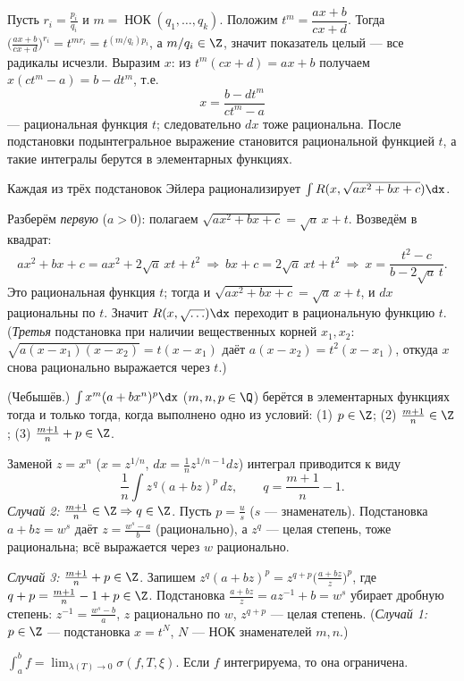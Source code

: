 \dok Пусть $r_i=\tfrac{p_i}{q_i}$ и $m=\operatorname{НОК}(q_1,\dots,q_k)$. Положим
$t^m=\dfrac{ax+b}{cx+d}$. Тогда
$\bigl(\tfrac{ax+b}{cx+d}\bigr)^{r_i}=t^{m r_i}=t^{(m/q_i)p_i}$, а $m/q_i\in\Z$, значит показатель
целый — все радикалы исчезли. Выразим $x$: из $t^m(cx+d)=ax+b$ получаем $x(ct^m-a)=b-dt^m$, т.е.
\[
  x=\frac{b-dt^m}{ct^m-a}
\]
— рациональная функция $t$; следовательно $dx$ тоже рациональна. После подстановки подынтегральное
выражение становится рациональной функцией $t$, а такие интегралы берутся в элементарных функциях.

\stmt Каждая из трёх подстановок Эйлера рационализирует $\int R(x,\sqrt{ax^2+bx+c})\dx$.

\dok Разберём \emph{первую} ($a>0$): полагаем $\sqrt{ax^2+bx+c}=\sqrt a\,x+t$. Возведём в квадрат:
\[
  ax^2+bx+c=ax^2+2\sqrt a\,xt+t^2\ \Rightarrow\ bx+c=2\sqrt a\,xt+t^2\ \Rightarrow\
  x=\frac{t^2-c}{b-2\sqrt a\,t}.
\]
Это рациональная функция $t$; тогда и $\sqrt{ax^2+bx+c}=\sqrt a\,x+t$, и $dx$ рациональны по $t$.
Значит $R(x,\sqrt{\dots})\dx$ переходит в рациональную функцию $t$. (\emph{Третья} подстановка при
наличии вещественных корней $x_1,x_2$: $\sqrt{a(x-x_1)(x-x_2)}=t(x-x_1)$ даёт
$a(x-x_2)=t^2(x-x_1)$, откуда $x$ снова рационально выражается через $t$.)

\stmt (Чебышёв.) $\int x^m(a+bx^n)^p\dx$ ($m,n,p\in\Q$) берётся в элементарных функциях тогда и
только тогда, когда выполнено одно из условий: (1) $p\in\Z$; (2) $\tfrac{m+1}{n}\in\Z$; (3)
$\tfrac{m+1}{n}+p\in\Z$.

\dok Заменой $z=x^n$ ($x=z^{1/n}$, $dx=\tfrac1n z^{1/n-1}dz$) интеграл приводится к виду
\[
  \frac1n\int z^{\,q}(a+bz)^p\,dz,\qquad q=\frac{m+1}{n}-1 .
\]
\emph{Случай 2:} $\tfrac{m+1}{n}\in\Z\Rightarrow q\in\Z$. Пусть $p=\tfrac us$ ($s$ — знаменатель).
Подстановка $a+bz=w^s$ даёт $z=\tfrac{w^s-a}{b}$ (рационально), а $z^{q}$ — целая степень, тоже
рациональна; всё выражается через $w$ рационально.

\emph{Случай 3:} $\tfrac{m+1}{n}+p\in\Z$. Запишем
$z^{q}(a+bz)^p=z^{q+p}\bigl(\tfrac{a+bz}{z}\bigr)^p$, где $q+p=\tfrac{m+1}{n}-1+p\in\Z$. Подстановка
$\tfrac{a+bz}{z}=az^{-1}+b=w^s$ убирает дробную степень: $z^{-1}=\tfrac{w^s-b}{a}$, $z$ рационально
по $w$, $z^{q+p}$ — целая степень. (\emph{Случай 1:} $p\in\Z$ — подстановка $x=t^N$, $N$ — НОК
знаменателей $m,n$.)

\stmt $\displaystyle\int_a^b f=\lim_{\lambda(T)\to0}\sigma(f,T,\xi)$. Если $f$ интегрируема, то она
ограничена.

